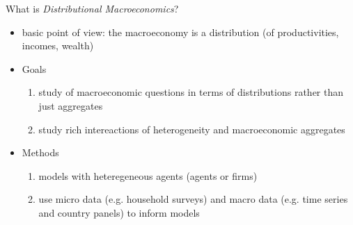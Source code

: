 \documentclass[aspectratio=169,mathserif]{beamer}
\newcommand\blfootnote[1]{%
  \begingroup
  \renewcommand\thefootnote{}\footnote{#1}%
  \addtocounter{footnote}{-1}%
  \endgroup
}
\newcommand{\credittoben}{\blfootnote{Taken from Ben Moll's slides with only minor adjustments}}
\begin{document}
\begin{frame}{What is \emph{Distributional Macroeconomics}?}

  \begin{itemize}
  \item basic point of view: the \alert{macroeconomy is a distribution} (of productivities, incomes, wealth)
  \item Goals
    \begin{enumerate}
    \item study of \alert{macroeconomic questions in terms of distributions} rather than just aggregates
      
    \item study \alert{rich intereactions} of heterogeneity and macroeconomic aggregates
    \end{enumerate}
  \item Methods
    \begin{enumerate}
    \item \alert{models with heteregeneous agents} (agents or firms)
    \item use \alert{micro data} (e.g. household surveys) and \alert{macro data} (e.g. time series and country panels) to inform models
    \end{enumerate}
  \end{itemize}
\end{frame}

%
\end{document}
